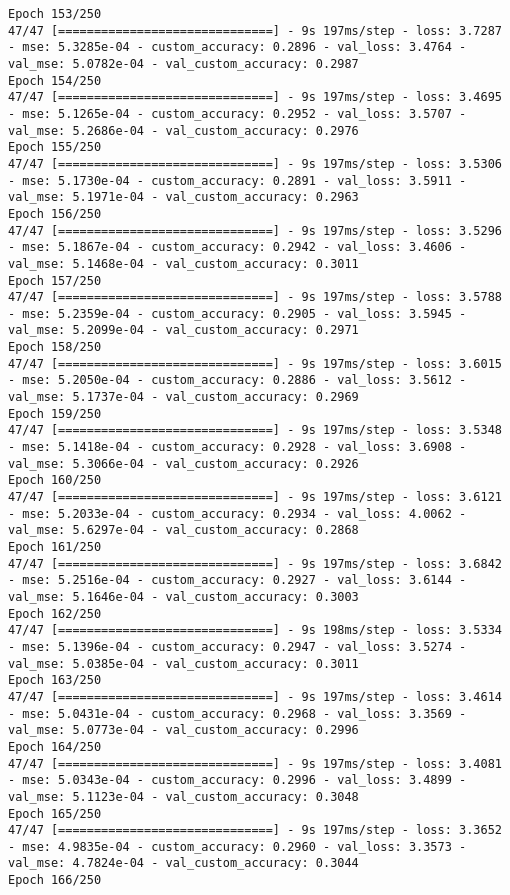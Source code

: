 \begin{lstlisting}
Epoch 153/250
47/47 [==============================] - 9s 197ms/step - loss: 3.7287 - mse: 5.3285e-04 - custom_accuracy: 0.2896 - val_loss: 3.4764 - val_mse: 5.0782e-04 - val_custom_accuracy: 0.2987
Epoch 154/250
47/47 [==============================] - 9s 197ms/step - loss: 3.4695 - mse: 5.1265e-04 - custom_accuracy: 0.2952 - val_loss: 3.5707 - val_mse: 5.2686e-04 - val_custom_accuracy: 0.2976
Epoch 155/250
47/47 [==============================] - 9s 197ms/step - loss: 3.5306 - mse: 5.1730e-04 - custom_accuracy: 0.2891 - val_loss: 3.5911 - val_mse: 5.1971e-04 - val_custom_accuracy: 0.2963
Epoch 156/250
47/47 [==============================] - 9s 197ms/step - loss: 3.5296 - mse: 5.1867e-04 - custom_accuracy: 0.2942 - val_loss: 3.4606 - val_mse: 5.1468e-04 - val_custom_accuracy: 0.3011
Epoch 157/250
47/47 [==============================] - 9s 197ms/step - loss: 3.5788 - mse: 5.2359e-04 - custom_accuracy: 0.2905 - val_loss: 3.5945 - val_mse: 5.2099e-04 - val_custom_accuracy: 0.2971
Epoch 158/250
47/47 [==============================] - 9s 197ms/step - loss: 3.6015 - mse: 5.2050e-04 - custom_accuracy: 0.2886 - val_loss: 3.5612 - val_mse: 5.1737e-04 - val_custom_accuracy: 0.2969
Epoch 159/250
47/47 [==============================] - 9s 197ms/step - loss: 3.5348 - mse: 5.1418e-04 - custom_accuracy: 0.2928 - val_loss: 3.6908 - val_mse: 5.3066e-04 - val_custom_accuracy: 0.2926
Epoch 160/250
47/47 [==============================] - 9s 197ms/step - loss: 3.6121 - mse: 5.2033e-04 - custom_accuracy: 0.2934 - val_loss: 4.0062 - val_mse: 5.6297e-04 - val_custom_accuracy: 0.2868
Epoch 161/250
47/47 [==============================] - 9s 197ms/step - loss: 3.6842 - mse: 5.2516e-04 - custom_accuracy: 0.2927 - val_loss: 3.6144 - val_mse: 5.1646e-04 - val_custom_accuracy: 0.3003
Epoch 162/250
47/47 [==============================] - 9s 198ms/step - loss: 3.5334 - mse: 5.1396e-04 - custom_accuracy: 0.2947 - val_loss: 3.5274 - val_mse: 5.0385e-04 - val_custom_accuracy: 0.3011
Epoch 163/250
47/47 [==============================] - 9s 197ms/step - loss: 3.4614 - mse: 5.0431e-04 - custom_accuracy: 0.2968 - val_loss: 3.3569 - val_mse: 5.0773e-04 - val_custom_accuracy: 0.2996
Epoch 164/250
47/47 [==============================] - 9s 197ms/step - loss: 3.4081 - mse: 5.0343e-04 - custom_accuracy: 0.2996 - val_loss: 3.4899 - val_mse: 5.1123e-04 - val_custom_accuracy: 0.3048
Epoch 165/250
47/47 [==============================] - 9s 197ms/step - loss: 3.3652 - mse: 4.9835e-04 - custom_accuracy: 0.2960 - val_loss: 3.3573 - val_mse: 4.7824e-04 - val_custom_accuracy: 0.3044
Epoch 166/250

\end{lstlisting}
